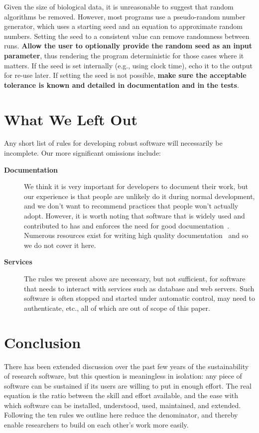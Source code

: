 \documentclass[10pt,letterpaper]{article}
\begin{document}
Given the size of biological data, it is unreasonable to suggest that
random algorithms be removed. However, most programs use a pseudo-random
number generator, which uses a starting seed and an equation to
approximate random numbers. Setting the seed to a consistent value
can remove randomness between runs. \textbf{Allow the user to optionally provide
the random seed as an input parameter}, thus rendering the program deterministic
for those cases where it matters. If the seed is set internally (e.g.,
using clock time), echo it to the output for re-use later. 
If setting the seed is not possible, \textbf{make sure the acceptable tolerance is
known and detailed in documentation and in the tests}.

\section*{What We Left Out}

Any short list of rules for developing robust software will
necessarily be incomplete.   Our more significant omissions
include:

\begin{description}

\item[\textbf{Documentation}] We think it is very important for
  developers to document their work, but our experience is that people
  are unlikely do it during normal development, and we don't want to
  recommend practices that people won't actually adopt. However, it is worth
  noting that software that is widely used and contributed to has and enforces
  the need for good documentation~\cite{gentleman2004}.
  Numerous resources exist for writing high quality
  documentation~\cite{karimzadeh2016} and so we do not cover it here.

\item[\textbf{Services}] The rules we present above are necessary, but
  not sufficient, for software that needs to interact with services
  such as database and web servers.  Such software is often stopped
  and started under automatic control, may need to authenticate, etc.,
  all of which are out of scope of this paper.

\end{description}

\section*{Conclusion}

There has been extended discussion over the past few years of the
sustainability of research software, but this question is meaningless
in isolation: any piece of software can be sustained if its users are
willing to put in enough effort.  The real equation is the ratio
between the skill and effort available, and the ease with which
software can be installed, understood, used, maintained, and extended.
Following the ten rules we outline here reduce the denominator, and
thereby enable researchers to build on each other's work more easily.
\end{document}
